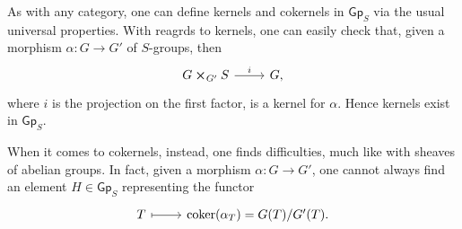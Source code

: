 \documentclass[../Main]{subfiles}
\begin{document}
\begin{rem}
	As with any category, one can define kernels and cokernels 
	in $\mathsf{Gp}_S$ via the usual universal properties.
	With reagrds to kernels, one can easily check that, given a morphism
	$\alpha\colon G \to G'$ of $S$-groups, then 
	\begin{equation}
	\begin{tikzcd}
		G \cross_{ G' } S \arrow[r, "i", rightarrow] &
		G,
	\end{tikzcd}
	\end{equation} 
	where $i$ is the projection on the first factor, is a kernel for $\alpha$.
	Hence kernels exist in $\mathsf{Gp}_S$.
	
	When it comes to cokernels, instead, one finds difficulties, much like
	with sheaves of abelian groups.
	In fact, given a morphism $\alpha\colon G \to G'$, one cannot always find an
	element $H \in \mathsf{Gp}_S$ representing the functor
	\begin{equation}
	\begin{tikzcd}
		T \arrow[r, "", mapsto] &
		\coker (\alpha_T) =
		G(T)/G'(T).
	\end{tikzcd}
	\end{equation}
\end{rem}
\end{document}
